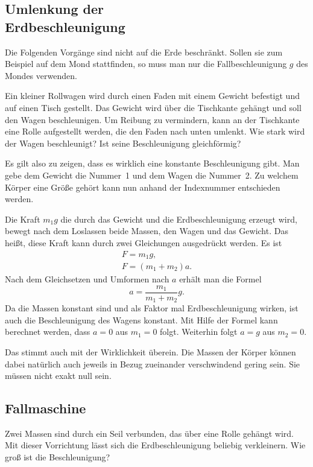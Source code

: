 \documentclass[a4paper,10pt,fleqn,twocolumn,twoside]{article}
\begin{document}
\subsection[Umlenkung der Erdbeschleunigung]
{Umlenkung der\\ Erdbeschleunigung}

Die Folgenden Vorgänge sind nicht auf die Erde beschränkt. Sollen
sie zum Beispiel auf dem Mond stattfinden, so muss man nur die
Fallbeschleunigung \(g\) des Mondes verwenden.

Ein kleiner Rollwagen wird durch einen Faden mit einem Gewicht
befestigt und auf einen Tisch gestellt. Das Gewicht wird über die
Tischkante gehängt und soll den Wagen beschleunigen. Um Reibung zu
vermindern, kann an der Tischkante eine Rolle aufgestellt werden, die
den Faden nach unten umlenkt. Wie stark wird der Wagen beschleunigt?
Ist seine Beschleunigung gleichförmig?

Es gilt also zu zeigen, dass es wirklich eine konstante Beschleunigung
gibt. Man gebe dem Gewicht die Nummer~1 und dem Wagen die Nummer~2.
Zu welchem Körper eine Größe gehört kann nun anhand der Indexnummer
entschieden werden.

Die Kraft \({m_1}g\) die durch das Gewicht und die Erdbeschleunigung
erzeugt wird, bewegt nach dem Loslassen beide Massen, den Wagen und das
Gewicht. Das heißt, diese Kraft kann durch zwei Gleichungen ausgedrückt
werden. Es ist
\begin{gather*}
F = {m_1}g,\\
F = (m_1+m_2)a.
\end{gather*}
Nach dem Gleichsetzen und Umformen nach \(a\) erhält man die Formel
\[a = \frac{m_1}{m_1+m_2} g.\]
Da die Massen konstant sind und als Faktor mal Erdbeschleunigung
wirken, ist auch die Beschleunigung des Wagens konstant. Mit Hilfe
der Formel kann berechnet werden, dass \(a=0\) aus \(m_1=0\) folgt.
Weiterhin folgt \(a=g\) aus \(m_2=0\).

Das stimmt auch mit der Wirklichkeit überein. Die Massen der Körper
können dabei natürlich auch jeweils in Bezug zueinander verschwindend
gering sein. Sie müssen nicht exakt null sein.

\subsection{Fallmaschine}

Zwei Massen sind durch ein Seil verbunden, das über eine Rolle gehängt
wird. Mit dieser Vorrichtung lässt sich die Erdbeschleunigung beliebig
verkleinern. Wie groß ist die Beschleunigung?
\end{document}
